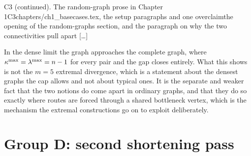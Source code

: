 \begin{offcutrewrite}{C3 (continued). The random-graph prose in Chapter 1}{C3}{chapters/ch1\_basecases.tex, the setup paragraphs and one overclaim}{the opening of the random-graphs section, and the paragraph on why the two connectivities pull apart}
[\dots]

In the dense limit the graph approaches the complete graph, where $\kappa^{\max} = \lambda^{\max} = n - 1$ for every pair and the gap closes entirely. What this shows is not the $m = 5$ extremal divergence, which is a statement about the densest graphs the cap allows and not about typical ones. It is the separate and weaker fact that the two notions do come apart in ordinary graphs, and that they do so exactly where routes are forced through a shared bottleneck vertex, which is the mechanism the extremal constructions go on to exploit deliberately.
\end{offcutrewrite}

\section*{Group D: second shortening pass}

